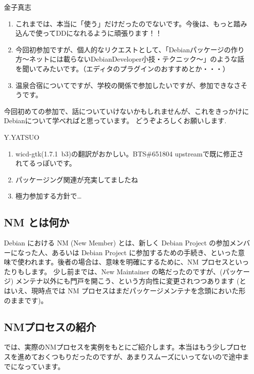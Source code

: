 \documentclass[mingoth,a4paper]{jsarticle}
\begin{document}
\begin{prework}{ 金子真志 }
  \begin{enumerate}
  \item これまでは、本当に「使う」だけだったのでないです。今後は、もっと踏み込んで使ってDDになれるように頑張ります！！
  \item 今回初参加ですが、個人的なリクエストとして、「Debianパッケージの作り方〜ネットには載らないDebianDeveloper小技・テクニック〜」のような話を聞いてみたいです。（エディタのプラグインのおすすめとか・・・）
  \item 温泉合宿についてですが、学校の関係で参加したいですが、参加できなさそうです。
  \end{enumerate}
  今回初めての参加で、話についていけないかもしれませんが、これをきっかけにDebianについて学べればと思っています。
  どうぞよろしくお願いします.
\end{prework}

\begin{prework}{ Y.YATSUO }
  \begin{enumerate}
  \item wicd-gtk(1.7.1~b3)の翻訳がおかしい。BTS\#651804 upstreamで既に修正されてるっぽいです。
  \item パッケージング関連が充実してましたね
  \item 極力参加する方針で…
  \end{enumerate}
\end{prework}


\clearpage
{}

\subsection{NM とは何か}

Debian における NM (New Member) とは、新しく Debian Project の参加メンバーになった人、あるいは Debian Project に参加するための手続き、といった意味で使われます。後者の場合は、意味を明確にするために、NM プロセスといったりもします。
少し前までは、New Maintainer の略だったのですが、(パッケージ) メンテナ以外にも門戸を開こう、という方向性に変更されつつあります (とはいえ、現時点では NM プロセスはまだパッケージメンテナを念頭においた形のままです)。

\subsection{NMプロセスの紹介}

では、実際のNMプロセスを実例をもとにご紹介します。本当はもう少しプロセスを進めておくつもりだったのですが、あまりスムーズにいってないので途中までになっています。
\end{document}
